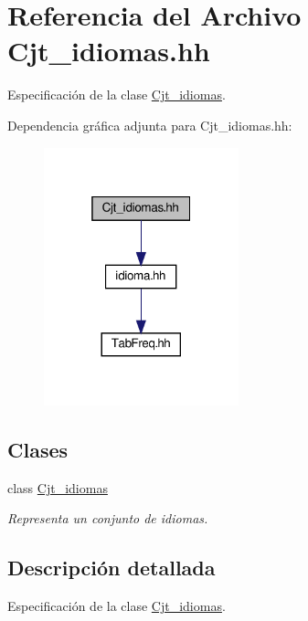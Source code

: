 \hypertarget{_cjt__idiomas_8hh}{}\section{Referencia del Archivo Cjt\+\_\+idiomas.\+hh}
\label{_cjt__idiomas_8hh}


Especificación de la clase \hyperlink{class_cjt__idiomas}{Cjt\+\_\+idiomas}.  


Dependencia gráfica adjunta para Cjt\+\_\+idiomas.\+hh\+:
\nopagebreak
\begin{figure}[H]
\begin{center}
\leavevmode
\includegraphics[width=160pt]{_cjt__idiomas_8hh__incl}
\end{center}
\end{figure}
\subsection*{Clases}
\begin{DoxyCompactItemize}
\item 
class \hyperlink{class_cjt__idiomas}{Cjt\+\_\+idiomas}
\begin{DoxyCompactList}\small\item\em Representa un conjunto de idiomas. \end{DoxyCompactList}\end{DoxyCompactItemize}


\subsection{Descripción detallada}
Especificación de la clase \hyperlink{class_cjt__idiomas}{Cjt\+\_\+idiomas}. 

